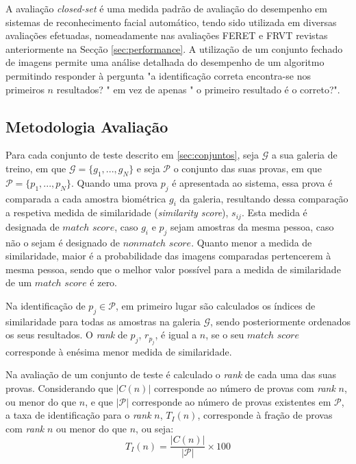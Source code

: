 A avaliação \textit{closed-set} é uma medida padrão de avaliação do desempenho em sistemas de reconhecimento facial automático, tendo sido utilizada em diversas avaliações efetuadas, nomeadamente nas avaliações FERET e FRVT revistas anteriormente na Secção \ref{sec:performance}. A utilização de um conjunto fechado de imagens permite uma análise detalhada do desempenho de um algoritmo permitindo responder à pergunta "a identificação correta encontra-se nos primeiros $n$ resultados? " em vez de apenas " o primeiro resultado é o correto?".

\subsection{Metodologia Avaliação}
Para cada conjunto de teste descrito em \ref{sec:conjuntos}, seja $\mathscr{G}$ a sua galeria de treino, em que $\mathscr{G} = \{g_1, ..., g_N\}$ e seja $\mathscr{P}$ o conjunto das suas provas, em que $\mathscr{P} = \{p_1, ..., p_N\}$. Quando uma prova $p_j$ é apresentada ao sistema, essa prova é comparada a cada amostra biométrica $g_i$ da galeria, resultando dessa comparação a respetiva medida de similaridade (\textit{similarity score}), $s_{ij}$. Esta medida é designada de $match$ $score$, caso $g_i$ e $p_j$ sejam amostras da mesma pessoa, caso não o sejam é designado de $nonmatch$ $score$. Quanto menor a medida de similaridade, maior é a probabilidade das imagens comparadas pertencerem à mesma pessoa, sendo que o melhor valor possível para a medida de similaridade de um $match$ $score$ é zero.

Na identificação de $p_j \in \mathscr{P}$, em primeiro lugar são calculados os índices de similaridade para todas as amostras na galeria $\mathscr{G}$, sendo posteriormente ordenados os seus resultados. O \textit{rank} de $p_j$, $r_{p_j}$, é igual a $n$, se o seu $match$ $score$ corresponde à enésima menor medida de similaridade. 

Na avaliação de um conjunto de teste é calculado o \textit{rank} de cada uma das suas provas. Considerando que $|C(n)|$ corresponde ao número de provas com \textit{rank} $n$, ou menor do que $n$, e que $|\mathscr{P}|$ corresponde ao número de provas existentes em $\mathscr{P}$, a taxa de identificação para o \textit{rank} $n$, $T_{I}(n)$, corresponde à fração de provas com \textit{rank} $n$ ou menor do que $n$, ou seja:
\begin{equation}
T_{I}(n) = \frac{|C(n)|}{|\mathscr{P}|} \times 100
\end{equation}

